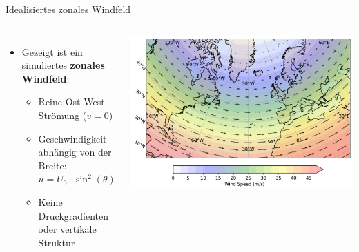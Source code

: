

\begin{frame}{Idealisiertes zonales Windfeld}
	\begin{columns}
		\begin{itemize}
			\item Gezeigt ist ein simuliertes \textbf{zonales Windfeld}:
			      \begin{itemize}
				      \item Reine Ost-West-Strömung (\(v = 0\))
				      \item Geschwindigkeit abhängig von der Breite: \(u = U_0 \cdot \sin^2(\theta)\)
				      \item Keine Druckgradienten oder vertikale Struktur
			      \end{itemize}
		\end{itemize}

		\centering
		\includegraphics[width=\linewidth]{../images/zonal_wind_plot.pdf}
	\end{columns}
\end{frame}


